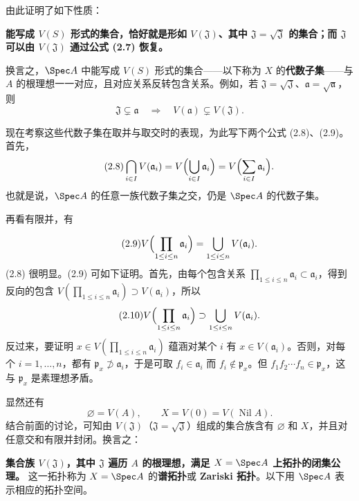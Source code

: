 由此证明了如下性质：

\textbf{能写成 $V(S)$ 形式的集合，恰好就是形如 $V(\mathfrak J)$、其中 $\mathfrak J=\sqrt{\mathfrak J}$ 的集合；而 $\mathfrak J$ 可以由 $V(\mathfrak J)$ 通过公式 (2.7) 恢复。}

换言之，$\Spec A$ 中能写成 $V(S)$ 形式的集合——以下称为 $X$ 的\textbf{代数子集}——与 $A$ 的根理想一一对应，且对应关系反转包含关系。例如，若 $\mathfrak J=\sqrt{\mathfrak J}$、$\mathfrak a=\sqrt{\mathfrak a}$，则
\[
\mathfrak J\subsetneq\mathfrak a\quad\Longrightarrow\quad
V(\mathfrak a)\subsetneq V(\mathfrak J).
\]

现在考察这些代数子集在取并与取交时的表现，为此写下两个公式 (2.8)、(2.9)。首先，
\begin{equation}\tag{2.8}
\bigcap_{i\in I}V(\mathfrak a_i)
=V\Bigl(\bigcup_{i\in I}\mathfrak a_i\Bigr)
=V\Bigl(\sum_{i\in I}\mathfrak a_i\Bigr).
\end{equation}
也就是说，$\Spec A$ 的任意一族代数子集之交，仍是 $\Spec A$ 的代数子集。

再看有限并，有

\begin{equation}\tag{2.9}
V\Bigl(\prod_{1\le i\le n}\mathfrak a_i\Bigr)
=\bigcup_{1\le i\le n}V(\mathfrak a_i).
\end{equation}
(2.8) 很明显。(2.9) 可如下证明。首先，由每个包含关系 $\prod_{1\le i\le n}\mathfrak a_i\subset\mathfrak a_i$，得到反向的包含 $V(\prod_{1\le i\le n}\mathfrak a_i)\supset V(\mathfrak a_i)$，所以
\begin{equation}\tag{2.10}
V\Bigl(\prod_{1\le i\le n}\mathfrak a_i\Bigr)
\supset\bigcup_{1\le i\le n}V(\mathfrak a_i).
\end{equation}
反过来，要证明 $x\in V(\prod_{1\le i\le n}\mathfrak a_i)$ 蕴涵对某个 $i$ 有 $x\in V(\mathfrak a_i)$。否则，对每个 $i=1,\ldots,n$，都有 $\mathfrak p_x\not\supset\mathfrak a_i$，于是可取 $f_i\in\mathfrak a_i$ 而 $f_i\notin\mathfrak p_x$。但 $f_1f_2\cdots f_n\in\mathfrak p_x$，这与 $\mathfrak p_x$ 是素理想矛盾。

显然还有
\begin{equation}\tag{2.11}
\varnothing=V(A),\qquad X=V(0)=V(\operatorname{Nil}A).
\end{equation}
结合前面的讨论，可知由 $V(\mathfrak J)$（$\mathfrak J=\sqrt{\mathfrak J}$）组成的集合族含有 $\varnothing$ 和 $X$，并且对任意交和有限并封闭。换言之：

\textbf{集合族 $V(\mathfrak J)$，其中 $\mathfrak J$ 遍历 $A$ 的根理想，满足 $X=\Spec A$ 上拓扑的闭集公理。}
这一拓扑称为 $X=\Spec A$ 的\textbf{谱拓扑}或 \textbf{Zariski 拓扑}。以下用 $\Spec A$ 表示相应的拓扑空间。

